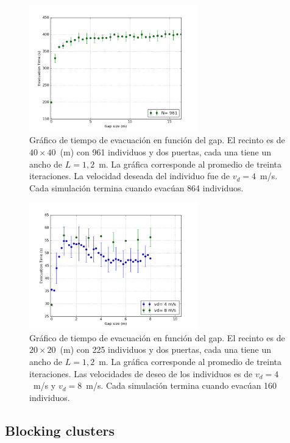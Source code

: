 \begin{figure}[H]
    \centering
    \includegraphics[height=5.5cm]{figuras/gap_vste_v4_961p.png}
    \caption[width=5cm]{Gráfico de tiempo de evacuación en función del gap. El recinto es de $40\times 40$~(m) con 961 individuos y dos puertas, cada una tiene un ancho de $L=1,2$~m. La gráfica corresponde al promedio de treinta iteraciones. La velocidad deseada del individuo fue de $v_d=4$~m/s. Cada simulación termina cuando evacúan 864 individuos.}
    \label{sintesis}
\end{figure}

\begin{figure}[H]
    \centering
    \includegraphics[height=5.5cm]{figuras/gap_vste_v4_v8.png}
    \caption[width=5cm]{Gráfico de tiempo de evacuación en función del gap. El recinto es de $20\times 20$~(m) con 225 individuos y dos puertas, cada una tiene un ancho de $L=1,2$~m. La gráfica corresponde al promedio de treinta iteraciones. Las velocidades de deseo de los individuos es de $v_d=4$~m/s y $v_d=8$~m/s. Cada simulación termina cuando evacúan 160 individuos.}
    \label{sintesis}
\end{figure}


\subsection{Blocking clusters}

